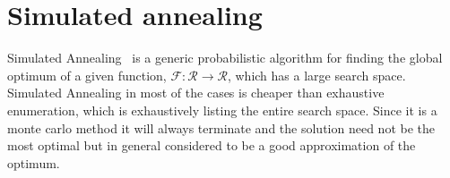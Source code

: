 \section{Simulated annealing}
\label{sec:simulated-annealing}

Simulated Annealing~\cite{skir83} is a generic probabilistic algorithm
for finding the global optimum of a given function,
$\mathcal{F}:\mathcal{R}\rightarrow\mathcal{R}$, which has a large
search space.  Simulated Annealing in most of the cases is cheaper than
exhaustive enumeration, which is exhaustively listing the entire search
space. Since it is a monte carlo method it will always terminate and the
solution need not be the most optimal but in general considered to be a
good approximation of the optimum.







